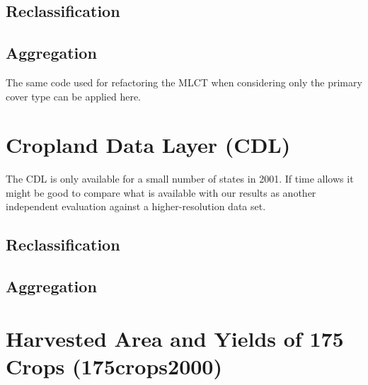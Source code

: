 \subsection{Reclassification}
\label{sec:nlcd-reclass}


\subsection{Aggregation}
\label{sec:nlcd-aggr}

The same code used for refactoring the MLCT when considering only the
primary cover type can be applied here.


\section{Cropland Data Layer (CDL)}
\label{sec:cdl}


The CDL is only available for a small number of states in 2001.  If
time allows it might be good to compare what is available with our
results as another independent evaluation against a higher-resolution
data set.

\subsection{Reclassification}
\label{sec:cdl-reclass}


\subsection{Aggregation}
\label{sec:cdl-aggr}


\section{Harvested Area and Yields of 175 Crops (175crops2000)}
\label{sec:175crops2000}

\citet{Monfreda2008}




